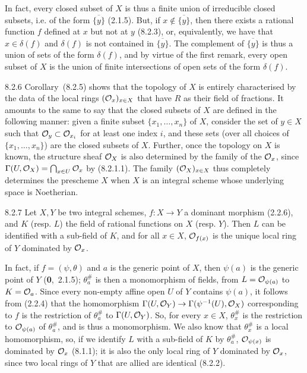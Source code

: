 \documentclass[../main.tex]{subfiles}
\begin{document}
In fact, every closed subset of $X$ is thus a finite union of irreducible closed subsets, i.e. of the form $\overline{\{y\}}$ (2.1.5).
But, if $x\not\in\overline{\{y\}}$, then there exists a rational function $f$ defined at $x$ but not at $y$ (8.2.3), or, equivalently, we have that $x\in\delta(f)$ and $\delta(f)$ is not contained in $\overline{\{y\}}$.
The complement  of $\overline{\{y\}}$ is thus a union of sets of the form $\delta(f)$, and by virtue of the first remark, every open subset of $X$ is the union of finite intersections of open sets of the form $\delta(f)$.

\begin{env}{8.2.6}
    Corollary~(8.2.5) shows that the topology of $X$ is entirely characterised by the data of the local rings $(\mathcal{O}_x)_{x\in X}$ that have $R$ as their field of fractions.
    It amounts to the same to say that the closed subsets of $X$ are defined in the following manner: given a finite subset $\{x_1,\ldots,x_n\}$ of $X$, consider the set of $y\in X$ such that $\mathcal{O}_y\subset\mathcal{O}_{x_i}$ for at least one index $i$, and these sets (over all choices of $\{x_1,\ldots,x_n\}$) are the closed subsets of $X$.
    Further, once the topology on $X$ is known, the structure sheaf $\mathcal{O}_X$ is also determined by the family of the $\mathcal{O}_x$, since $\Gamma(U,\mathcal{O}_X)=\bigcap_{x\in U}\mathcal{O}_x$ by (8.2.1.1).
    The family $(\mathcal{O}_X)_{x\in X}$ thus completely determines the prescheme $X$ when $X$ is an integral scheme whose underlying space is Noetherian.
\end{env}

\begin{env}[Proposition]{8.2.7}
    Let $X,Y$ be two integral schemes, $f\colon X\to Y$ a dominant morphism (2.2.6), and $K$ (resp. $L$) the field of rational functions on $X$ (resp. $Y$).
    Then $L$ can be identified with a sub-field of $K$, and for all $x\in X$, $\mathcal{O}_{f(x)}$ is the unique local ring of $Y$ dominated by $\mathcal{O}_x$.
\end{env}

In fact, if $f=(\psi,\theta)$ and $a$ is the generic point of $X$, then $\psi(a)$ is the generic point of $Y$ (\textbf{0},~2.1.5); $\theta_a^\#$ is then a monomorphism of fields, from $L=\mathcal{O}_{\psi(a)}$ to $K=\mathcal{O}_a$.
Since every non-empty affine open $U$ of $Y$ contains $\psi(a)$, it follows from (2.2.4) that the homomorphism $\Gamma(U,\mathcal{O}_Y)\to\Gamma(\psi^{-1}(U),\mathcal{O}_X)$ corresponding to $f$ is the restriction of $\theta_a^\#$ to $\Gamma(U,\mathcal{O}_Y)$.
So, for every $x\in X$, $\theta_x^\#$ is the restriction to $\mathcal{O}_{\psi(a)}$ of $\theta_a^\#$, and is thus a monomorphism.
We also know that $\theta_x^\#$ is a local homomorphism, so, if we identify $L$ with a sub-field of $K$ by $\theta_a^\#$, $\mathcal{O}_{\psi(x)}$ is dominated by $\mathcal{O}_x$ (8.1.1); it is also the only local ring of $Y$ dominated by $\mathcal{O}_x$, since two local rings of $Y$ that are allied are identical (8.2.2).
\end{document}
